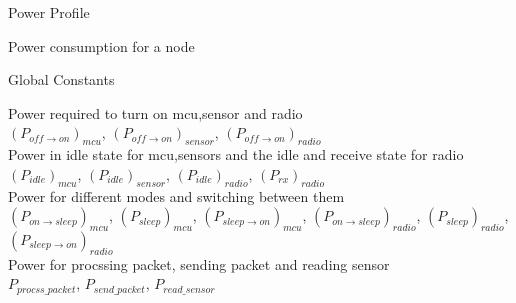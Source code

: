 \documentclass{article}
\begin{document}
\centerline{\sc \huge Power Profile}


\begin{center}
	\large{Power consumption for a node}
\end{center}

\begin{center}
	Global Constants
\end{center}

Power required to turn on mcu,sensor and radio \\
$(P_{off \to on})_{mcu}$,
$(P_{off \to on})_{sensor}$,
$(P_{off \to on})_{radio}$
\\

Power in idle state for mcu,sensors and the idle and receive state for radio \\
$(P_{idle})_{mcu}$,
$(P_{idle})_{sensor}$,
$(P_{idle})_{radio}$,
$(P_{rx})_{radio}$
\\

Power for different modes and switching between them \\
$(P_{on \to sleep})_{mcu}$,
$(P_{sleep})_{mcu}$,
$(P_{sleep \to on})_{mcu}$,
$(P_{on \to sleep})_{radio}$,
$(P_{sleep})_{radio}$,
$(P_{sleep \to on})_{radio}$
\\

Power for procssing packet, sending packet and reading sensor \\
$P_{procss\_packet}$,
$P_{send\_packet}$,
$P_{read\_sensor}$
\\
\end{document}
